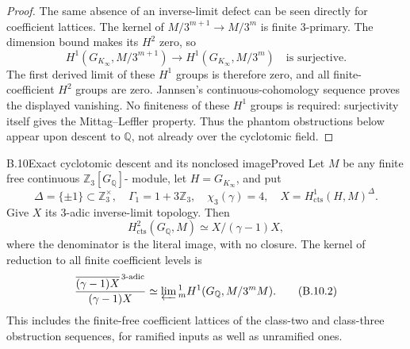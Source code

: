 \begin{proof}
The same absence of an inverse-limit defect can be seen
directly for coefficient lattices. The kernel of
$M/3^{m+1}\to M/3^m$ is finite $3$-primary. The dimension
bound makes its $H^2$ zero, so
\[
 H^1(G_{K_\infty},M/3^{m+1})
       \longrightarrow H^1(G_{K_\infty},M/3^m)
                     \quad\text{is surjective}.
\]
The first derived limit of these $H^1$ groups is therefore
zero, and all finite-coefficient $H^2$ groups are zero.
Jannsen's continuous-cohomology sequence proves the displayed
vanishing. No finiteness of these $H^1$ groups is required:
surjectivity itself gives the Mittag--Leffler property.
Thus the phantom obstructions below appear upon descent to
$\mathbb Q$, not already over the cyclotomic field.
\end{proof}

\begin{statement}{B.10}{Exact cyclotomic descent and its nonclosed image}{Proved}
Let $M$ be any finite free continuous $\mathbb Z_3[G_{\mathbb Q}]$-
module, let $H=G_{K_\infty}$, and put
\[
 \Delta=\{\pm1\}\subset\mathbb Z_3^\times,
 \quad\Gamma_1=1+3\mathbb Z_3,
 \quad\chi_3(\gamma)=4,
 \quad X=H^1_{\mathrm{cts}}(H,M)^\Delta.
\]
Give $X$ its $3$-adic inverse-limit topology. Then
\[
 H^2_{\mathrm{cts}}(G_{\mathbb Q},M)
       \simeq X/(\gamma-1)X,                                      \tag{B.10.1}
\]
where the denominator is the literal image, with no closure. The
kernel of reduction to all finite coefficient levels is
\[
 \frac{\overline{(\gamma-1)X}^{\,3\text{-adic}}}{(\gamma-1)X}
       \simeq\varprojlim{}^1_m H^1(G_{\mathbb Q},M/3^mM).           \tag{B.10.2}
\]
This includes the finite-free coefficient lattices of the class-two
and class-three obstruction sequences, for ramified inputs as well
as unramified ones.
\end{statement}
